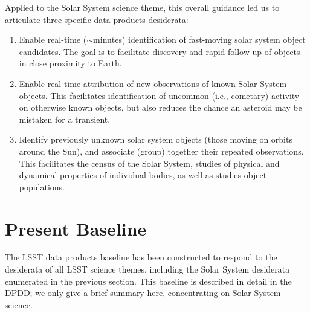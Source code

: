 \documentclass[DM,authoryear,toc]{lsstdoc}
\begin{document}
Applied to the Solar System science theme, this overall guidance led us to 
articulate three specific data products desiderata:
%
\begin{enumerate}
	\item Enable real-time ($\sim$minutes) identification of fast-moving solar system object candidates. The goal is to facilitate discovery and rapid follow-up of objects in close proximity to Earth.
	\item Enable real-time attribution of new observations of known Solar System objects. This facilitates identification of uncommon (i.e., cometary) activity on otherwise known objects, but also reduces the chance an asteroid may be mistaken for a transient.
	\item Identify previously unknown solar system objects (those moving on orbits around the Sun), and associate (group) together their repeated observations. This facilitates the census of the Solar System, studies of physical and dynamical properties of individual bodies, as well as studies object populations.
\end{enumerate}


\section{Present Baseline}

The LSST data products baseline  has been constructed to respond to the desiderata of all LSST science themes, including the Solar System desiderata enumerated in the previous section. This baseline is described in detail in the DPDD; we only give a brief summary here, concentrating on Solar System science.
\end{document}

